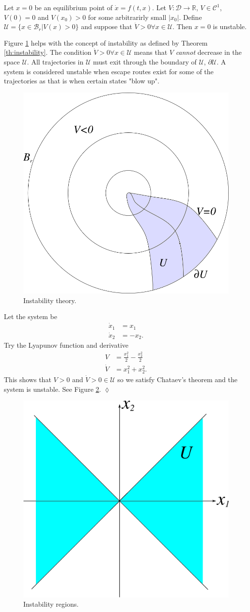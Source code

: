 \begin{theorem}
\label{th:instability}
Let $x=0$ be an equilibrium point of $\dot{x}=f(t,x)$. Let $V:\mathcal{D}\to\mathbb{R}$, $V\in\mathcal{C}^1$, $V(0)=0$ and $V(x_0)>0$ for some arbitrarirly small $|x_0|$. Define $\mathcal{U}=\{x\in \mathcal{B}_r | V(x)>0\}$ and suppose that $\dot{V}>0 \forall x\in\mathcal{U}$. Then $x=0$ is unstable.
\end{theorem}

Figure \ref{fig:10theoremBall} helps with the concept of instability as defined by Theorem \ref{th:instability}. The condition $\dot{V}>0\forall x\in\mathcal{U}$ means that $V$ \textit{cannot} decrease in the space $\mathcal{U}$. All trajectories in $\mathcal{U}$ must exit through the boundary of $\mathcal{U}$, $\partial\mathcal{U}$. A system is considered unstable when escape routes exist for some of the trajectories as that is when certain states "blow up".

\begin{figure}[ht!]
	\centering
	\includegraphics[width=.4\textwidth]{images/10theoremBall}
	\caption{Instability theory.}
	\label{fig:10theoremBall}
\end{figure}

\begin{example}
Let the system be
\begin{align*}
\dot{x}_1 &= x_1 \\
\dot{x}_2 &= -x_2.
\end{align*}
Try the Lyapunov function and derivative
\begin{align*}
V &= \frac{x_1^2}{2} - \frac{x_2^2}{2} \\
\dot{V} &= x_1^2 + x_2^2.
\end{align*}
This shows that $V>0$ and $\dot{V}>0\in\mathcal{U}$ so we satisfy Chataev's theorem and the system is unstable. See Figure \ref{fig:10unstableV}.
$\lozenge$
\end{example}

\begin{figure}[ht!]
	\centering
	\includegraphics[width=.4\textwidth]{images/10unstableV}
	\caption{Instability regions.}
	\label{fig:10unstableV}
\end{figure}

